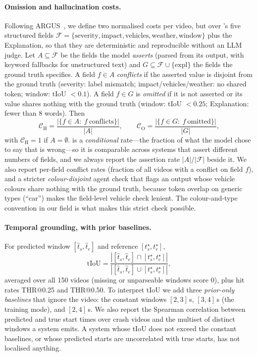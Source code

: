 \paragraph{Omission and hallucination costs.}
\label{sec:metrics-ho}
Following ARGUS~\cite{argus2025}, we define two normalised costs per video, but over \dataset{}'s five structured fields $\mathcal{F}=\{\text{severity},\text{impact},\text{vehicles},\text{weather},\text{window}\}$ plus the Explanation, so that they are deterministic and reproducible without an LLM judge.
Let $A\subseteq\mathcal{F}$ be the fields the model \emph{asserts} (parsed from its output, with keyword fallbacks for unstructured text) and $G\subseteq\mathcal{F}\cup\{\text{expl}\}$ the fields the ground truth specifies.
A field $f\in A$ \emph{conflicts} if the asserted value is disjoint from the ground truth (severity: label mismatch; impact/vehicles/weather: no shared token; window: tIoU $<0.1$).
A field $f\in G$ is \emph{omitted} if it is not asserted or its value shares nothing with the ground truth (window: tIoU $<0.25$; Explanation: fewer than 8 words).
Then
\begin{equation}
\mathcal{C}_{\mathrm{H}}=\frac{|\{f\in A:\ f\ \text{conflicts}\}|}{|A|},\qquad
\mathcal{C}_{\mathrm{O}}=\frac{|\{f\in G:\ f\ \text{omitted}\}|}{|G|},
\label{eq:ho}
\end{equation}
with $\mathcal{C}_{\mathrm{H}}{=}1$ if $A{=}\emptyset$.
\Hcost{} is a \emph{conditional} rate---the fraction of what the model chose to say that is wrong---so it is comparable across systems that assert different numbers of fields, and we always report the assertion rate $|A|/|\mathcal{F}|$ beside it.
We also report per-field conflict rates (fraction of all videos with a conflict on field $f$), and a stricter \emph{colour-disjoint} agent check that flags an output whose vehicle colours share nothing with the ground truth, because token overlap on generic types (``car'') makes the field-level vehicle check lenient.
The colour-and-type convention in our  field is what makes this strict check possible.

\paragraph{Temporal grounding, with prior baselines.}
\label{sec:metrics-temporal}
For predicted window $[\hat t_s,\hat t_e]$ and reference $[t_s^\star,t_e^\star]$,
\begin{equation}
\mathrm{tIoU}=\frac{|[\hat t_s,\hat t_e]\cap[t_s^\star,t_e^\star]|}{|[\hat t_s,\hat t_e]\cup[t_s^\star,t_e^\star]|},
\label{eq:tiou}
\end{equation}
averaged over all 150 videos (missing or unparseable windows score 0), plus hit rates THR@0.25 and THR@0.50.
To interpret tIoU we add three \emph{prior-only baselines} that ignore the video: the constant windows $[2,3]$\,s, $[3,4]$\,s (the training mode), and $[2,4]$\,s.
We also report the Spearman correlation between predicted and true start times over crash videos and the multiset of distinct windows a system emits.
A system whose tIoU does not exceed the constant baselines, or whose predicted starts are uncorrelated with true starts, has not localised anything.

